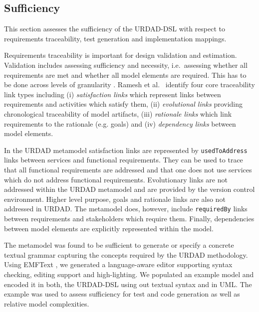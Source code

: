 
\subsection{Sufficiency}

This section assesses the sufficiency of the URDAD-DSL with respect to requirements traceability, test generation and implementation mappings. 

Requirements traceability is important for design validation and estimation. Validation includes assessing sufficiency and necessity, i.e.\ assessing whether all requirements are met and whether all model elements are required. This has to be done across levels of granularity \cite{dick_design_2005}. Ramesh et al.\ \cite{ramesh_toward_2001} identify four core traceability link types including (i) \emph{satisfaction links} which represent links between requirements and activities which satisfy them, (ii) \emph{evolutional links} providing chronological traceability of model artifacts, (iii) \emph{rationale links} which link requirements to the rationale (e.g. goals) and (iv) \emph{dependency links} between model elements.

In the URDAD metamodel satisfaction links are represented by \verb+usedToAddress+ links between services and functional requirements. They can be used to trace that all functional requirements are addressed and that one does not use services which do not address functional requirements. Evolutionary links are not addressed within the URDAD metamodel and are provided by the version control environment. Higher level purpose, goals and rationale links are also not addressed in URDAD. The metamodel does, however, include  \verb+requiredBy+ links between requirements and stakeholders which require them. Finally, dependencies between model elements are explicitly represented within the model. 

The metamodel was found to be sufficient to generate or specify a concrete textual grammar capturing the concepts required by the URDAD methodology. Using EMFText \cite{heidenreich_derivation_2009}, we generated a language-aware editor supporting syntax checking, editing support and high-lighting. We populated an example model and encoded it in both, the URDAD-DSL using out textual syntax and in UML. The example was used to assess sufficiency for test and code generation as well as relative model complexities.

